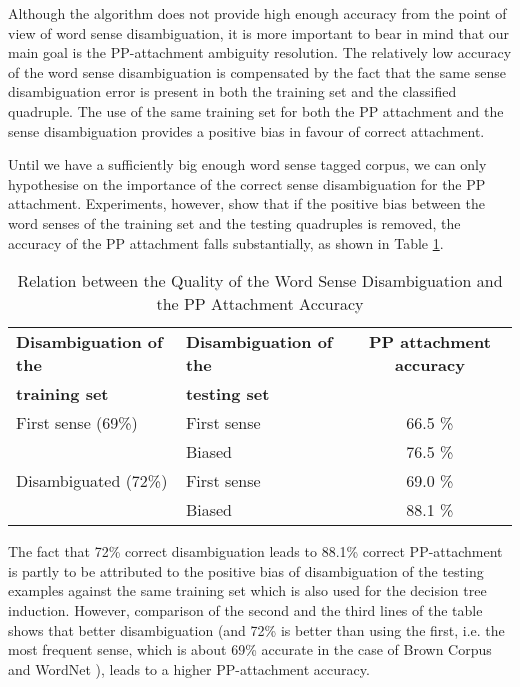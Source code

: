 Although the algorithm does not provide high enough accuracy from the point of view of word sense disambiguation, it is more important to bear in mind that our main goal is the PP-attachment ambiguity resolution. The relatively low accuracy of the word sense disambiguation is compensated by the fact that the same sense disambiguation error is present in both the training set and the classified quadruple. The use of the same training set for both the PP attachment and the sense disambiguation provides a positive bias in favour of correct attachment.

Until we have a sufficiently big enough word sense tagged corpus, we can only hypothesise on the importance of the correct sense disambiguation for the PP attachment. Experiments, however, show that if the positive bias between the word senses of the training set and the testing quadruples is removed, the accuracy of the PP attachment falls substantially, as shown in Table \ref{tab:3}. 


\begin{table}[t]
  \leavevmode
    \caption{Relation between the Quality of the Word Sense Disambiguation and\\ the PP Attachment Accuracy}
    \label{tab:3}
  \begin{center}
\begin{tabular}[c]{|l|l|c|}\hline
{\bf Disambiguation of the} & {\bf Disambiguation of the} & {\bf PP attachment accuracy}\\
{\bf training set} & {\bf testing set} & \\\hline
First sense (69\%) & First sense & 66.5 \%\\\hline
 & Biased & 76.5 \%\\\hline
Disambiguated (72\%) & First sense & 69.0 \%\\\hline
 & Biased & 88.1 \%\\\hline
\end{tabular}
\end{center}
\end{table}


The fact that 72\% correct disambiguation leads to 88.1\% correct PP-attachment is partly to be attributed to the positive bias of disambiguation of the testing examples against the same training set which is also used for the decision tree induction. However, comparison of the second and the third lines of the table shows that better disambiguation (and 72\% is better than using the first, i.e. the most frequent sense, which is about 69\% accurate in the case of Brown Corpus and WordNet \cite{MC94}), leads to a higher PP-attachment accuracy.

